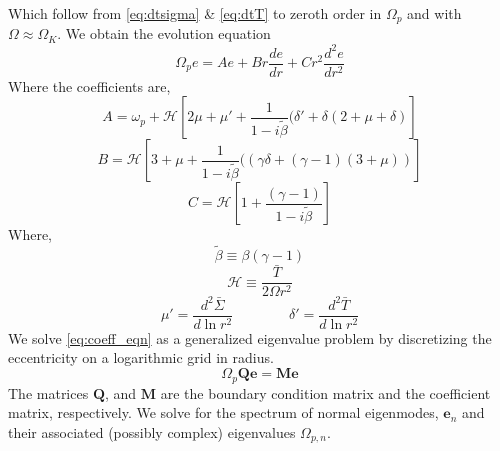 \documentclass[apj]{emulateapj}
\begin{document}
Which follow from \eqref{eq:dtsigma} \& \eqref{eq:dtT} to zeroth order in $\Omega_p$ and with $\Omega \approx \Omega_K$. We obtain the evolution equation 
\begin{equation} \label{eq:coeff_eqn}
\Omega_p e  = A e + B r \frac{d e}{d r} + C r^2 \frac{d^2 e}{ d r^2}
\end{equation}
Where the coefficients are,
\begin{equation}
A = \omega_p  + \mathcal{H} \left[ 2 \mu + \mu'  + \frac{1}{1 - i  \tilde{\beta}} ( \delta' + \delta (2 + \mu + \delta) \right]
\end{equation}
\begin{equation}
B = \mathcal{H} \left[ 3 + \mu + \frac{1}{1 - i \tilde{\beta}} ( \left( \gamma \delta + (\gamma -1 ) (3 + \mu) \right) \right]
\end{equation}
\begin{equation}
C = \mathcal{H} \left[ 1 +  \frac{(\gamma - 1)}{1 - i  \tilde{\beta}} \right]
\end{equation}
Where,
\begin{equation}
\tilde{ \beta} \equiv \beta ( \gamma - 1)
\end{equation}
\begin{equation}
\mathcal{H} \equiv \frac{  \bar{T}}{ 2 \Omega r^2}
\end{equation}
\begin{equation}
\mu ' = \frac{d ^2 \bar{\Sigma}}{d \ln r^2} 
\qquad \qquad
\delta' = \frac{d ^2 \bar{T}}{d \ln r^2}
\end{equation}
We solve \eqref{eq:coeff_eqn} as a generalized eigenvalue problem by discretizing the eccentricity on a logarithmic grid in radius. 
\begin{equation}
\Omega_p \mathbf{Q} \mathbf{e} = \mathbf{M} \mathbf{e}
\end{equation}
The matrices $\mathbf{Q}$, and $\mathbf{M}$ are the boundary condition matrix and the coefficient matrix, respectively. We solve for the spectrum of normal eigenmodes, $\mathbf{e}_n$ and their associated (possibly complex) eigenvalues $\Omega_{p,n}$. 
\end{document}
